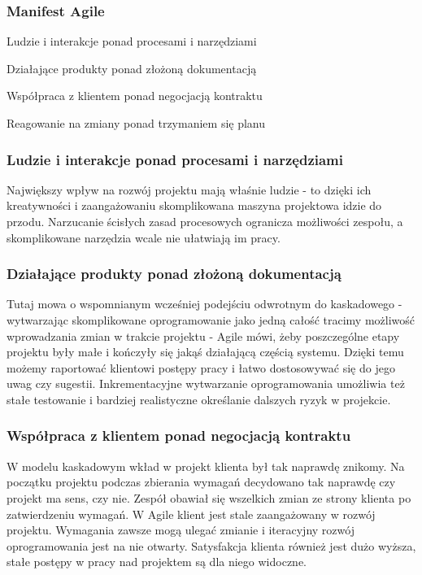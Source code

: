 \documentclass{article}
\begin{document}
\subsubsection{Manifest Agile}

\begin{center}
    Ludzie i interakcje ponad procesami i narzędziami

    Działające produkty ponad złożoną dokumentacją

    Współpraca z klientem ponad negocjacją kontraktu

    Reagowanie na zmiany ponad trzymaniem się planu\cite{scrum}
\end{center}

\subsubsection*{Ludzie i interakcje ponad procesami i narzędziami}
Największy wpływ na rozwój projektu mają właśnie ludzie - to dzięki ich kreatywności i zaangażowaniu skomplikowana maszyna projektowa idzie do przodu. Narzucanie ścisłych zasad procesowych ogranicza możliwości zespołu, a skomplikowane narzędzia wcale nie ułatwiają im pracy.

\subsubsection*{Działające produkty ponad złożoną dokumentacją}
Tutaj mowa o wspomnianym wcześniej podejściu odwrotnym do kaskadowego - wytwarzając skomplikowane oprogramowanie jako jedną całość tracimy możliwość wprowadzania zmian w trakcie projektu - Agile mówi, żeby poszczególne etapy projektu były małe i kończyły się jakąś działającą częścią systemu. Dzięki temu możemy raportować klientowi postępy pracy i łatwo dostosowywać się do jego uwag czy sugestii. Inkrementacyjne wytwarzanie oprogramowania umożliwia też stałe testowanie i bardziej realistyczne określanie dalszych ryzyk w projekcie.

\subsubsection*{Współpraca z klientem ponad negocjacją kontraktu}
W modelu kaskadowym wkład w projekt klienta był tak naprawdę znikomy. Na początku projektu podczas zbierania wymagań decydowano tak naprawdę czy projekt ma sens, czy nie. Zespół obawiał się wszelkich zmian ze strony klienta po zatwierdzeniu wymagań. W Agile klient jest stale zaangażowany w rozwój projektu. Wymagania zawsze mogą ulegać zmianie i iteracyjny rozwój oprogramowania jest na nie otwarty. Satysfakcja klienta również jest dużo wyższa, stałe postępy w pracy nad projektem są dla niego widoczne.
\end{document}
